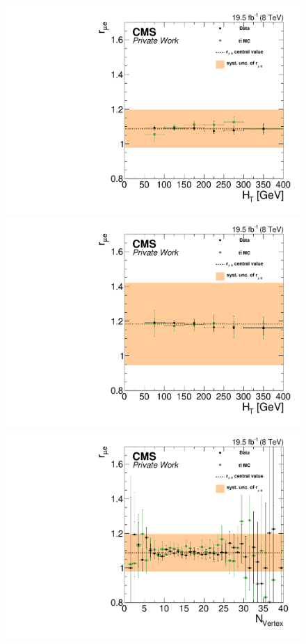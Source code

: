 \begin{figure}[htbp]
\centering
\begin{minipage}[t]{0.49\textwidth}
  \includegraphics[width=\textwidth]{plots/BG/rmue/rMuE_ZPeakControlCentral_Full2012_HT_None.pdf}
\end{minipage}
\begin{minipage}[t]{0.49\textwidth}
\includegraphics[width=\textwidth]{plots/BG/rmue/rMuE_ZPeakControlForward_Full2012_HT_None.pdf}
\end{minipage}
\begin{minipage}[t]{0.49\textwidth}
  \includegraphics[width=\textwidth]{plots/BG/rmue/rMuE_ZPeakControlCentral_Full2012_nVtx_None.pdf}

\end{minipage}
\end{figure}
